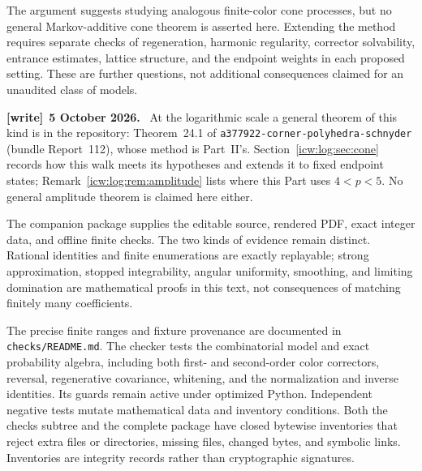 \documentclass[11pt,letterpaper]{article}
\theoremstyle{remark}\newtheorem{remark}[theorem]{Remark}
\newcommand{\1}{\mathbf1}
\newenvironment{writenote}[1][]{\par\smallskip\begingroup\small
 \noindent\textbf{[write]}\if\relax\detokenize{#1}\relax\else~\textbf{#1.}\fi\ }%
 {\par\endgroup\smallskip}
\newcommand{\file}[1]{\textup{\nolinkurl{#1}}}
\begin{document}
The argument suggests studying analogous finite-color cone processes,
but no general Markov-additive cone theorem is asserted here. Extending
the method requires separate checks of regeneration, harmonic regularity,
corrector solvability, entrance estimates, lattice structure, and the
endpoint weights in each proposed setting. These are further questions,
not additional consequences claimed for an unaudited class of models.
\begin{writenote}[5 October 2026]
At the logarithmic scale a general theorem of this kind is in the repository: Theorem~24.1 of \file{a377922-corner-polyhedra-schnyder} (bundle Report~112), whose method is Part~II's. Section~\ref{icw:log:sec:cone} records how this walk meets its hypotheses and extends it to fixed endpoint states; Remark~\ref{icw:log:rem:amplitude} lists where this Part uses $4<p<5$. No general amplitude theorem is claimed here either.
\end{writenote}

The companion package supplies the editable source, rendered PDF,
exact integer data, and offline finite checks. The two kinds of evidence
remain distinct. Rational identities and finite enumerations are exactly
replayable; strong approximation, stopped integrability, angular
uniformity, smoothing, and limiting domination are mathematical proofs
in this text, not consequences of matching finitely many coefficients.

The precise finite ranges and fixture provenance are documented in
\texttt{checks/README.md}. The checker tests the combinatorial model and
exact probability algebra, including both first- and second-order color
correctors, reversal, regenerative covariance, whitening, and the
normalization and inverse identities. Its guards remain active under
optimized Python. Independent negative tests mutate mathematical data
and inventory conditions. Both the checks subtree and the complete
package have closed bytewise inventories that reject extra files or
directories, missing files, changed bytes, and symbolic links. Inventories
are integrity records rather than cryptographic signatures.
\end{document}
